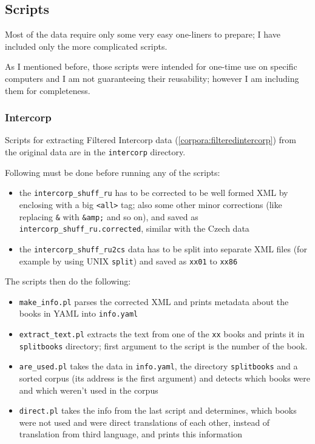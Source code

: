 \subsection{Scripts}
Most of the data require only some very easy one-liners to prepare; I have included only the more complicated scripts. 

As I mentioned before, those scripts were intended for one-time use on specific computers and I am not guaranteeing their reusability; however I am including them for completeness.

\subsubsection{Intercorp}
Scripts for extracting Filtered Intercorp data (\ref{corpora:filteredintercorp}) from the original data are in the \texttt{intercorp} directory.

Following must be done before running any of the scripts:
\begin{itemize}
\item the \texttt{intercorp\_shuff\_ru} has to be corrected to be well formed XML by enclosing with a big \texttt{<all>} tag; also some other minor corrections (like replacing \texttt{\&} with \texttt{\&amp;} and so on), and saved as \texttt{intercorp\_shuff\_ru.corrected}, similar with the Czech data
\item the \texttt{intercorp\_shuff\_ru2cs} data has to be split into separate XML files (for example by using UNIX \texttt{split}) and saved as \texttt{xx01} to \texttt{xx86}
\end{itemize}

The scripts then do the following:
\begin{itemize}
\item \texttt{make\_info.pl} parses the corrected XML and prints metadata about the books in YAML into \texttt{info.yaml}
\item \texttt{extract\_text.pl} extracts the text from one of the \texttt{xx} books and prints it in \texttt{splitbooks} directory; first argument to the script is the number of the book.  
\item \texttt{are\_used.pl} takes the data in \texttt{info.yaml}, the directory \texttt{splitbooks} and a sorted corpus (its address is the first argument) and detects which books were and which weren't used in the corpus
\item \texttt{direct.pl} takes the info from the last script and determines, which books were not used and were direct translations of each other, instead of translation from third language, and prints this information
\end{itemize}

